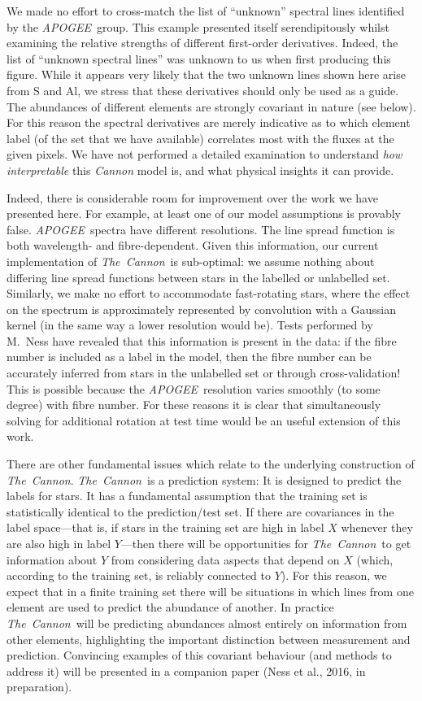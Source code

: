 \documentclass[12pt,preprint]{aastex}
\newcommand{\project}[1]{\textsl{#1}}
\newcommand{\TheCannon}{\project{The~Cannon}}
\newcommand{\tc}{\TheCannon}
\newcommand{\acronym}[1]{{\small{#1}}}
\newcommand{\apogee}{\project{\acronym{APOGEE}}}
\begin{document}
We made no effort to cross-match the list of ``unknown'' spectral lines
identified by the \apogee\ group.  This example presented itself
serendipitously whilst examining the relative strengths of different
first-order derivatives.  Indeed, the list of ``unknown spectral lines''
was unknown to us when first producing this figure.  While it appears
very likely that the two unknown lines shown here arise from S and Al,
we stress that these derivatives should only be used as a guide.  The
abundances of different elements are strongly covariant in nature (see below).
For this reason the spectral derivatives are merely indicative as to
which element label (of the set that we have available) correlates
most with the fluxes at the given pixels.  We have not performed
a detailed examination to understand \emph{how interpretable} this
\emph{Cannon} model is, and what physical insights it can provide.


Indeed, there is considerable room for improvement over the work
we have presented here.  For example, at least one of our model 
assumptions is provably false. \apogee\ spectra have
different resolutions.  The line spread function is both wavelength- and 
fibre-dependent.  Given this information, our current implementation of \tc\ is  
sub-optimal: we assume nothing about differing line spread functions between 
stars in the labelled or unlabelled set.  Similarly, we make no effort to 
accommodate fast-rotating stars, where the effect on the spectrum is 
approximately represented by convolution with a Gaussian kernel (in the same way
a lower resolution would be).  Tests performed by M.~Ness have revealed that 
this information is present in the data: if the fibre number is included as a
label in the model, then the fibre number can be accurately inferred from stars
in the unlabelled set or through cross-validation!  This is possible because the 
\apogee\ resolution varies smoothly (to some degree) with fibre number.  For 
these reasons it is clear that simultaneously solving for additional rotation
at test time would be an useful extension of this work.  


There are other fundamental issues which relate to the underlying construction
of \TheCannon.  \TheCannon\ is a prediction system: It is designed to predict
the labels for stars.  It has a fundamental assumption that the training set
is statistically identical to the prediction/test set.  If there are covariances
in the label space---that is, if stars in the training set are high in label $X$ whenever
they are also high in label $Y$---then there will be opportunities for 
\TheCannon\ to get information about $Y$ from considering data aspects that 
depend on $X$ (which, according to the training set, is reliably connected to 
$Y$).  For this reason, we expect that in a finite training set there will
be situations in which lines from one element are used to predict the abundance
of another.  In practice \TheCannon\ will be predicting abundances almost
entirely on information from other elements, highlighting the important
distinction between measurement and prediction. Convincing examples of this
covariant behaviour (and methods to address it) will be presented in a 
companion paper (Ness et al., 2016, in preparation).  
\end{document}
